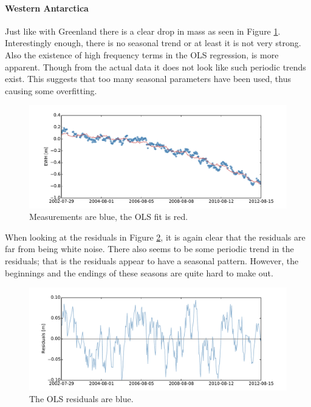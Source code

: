 \paragraph{Western Antarctica}

Just like with Greenland there is a clear drop in mass as seen in Figure \ref{fig:ols-selected-1-fit}. Interestingly enough, there is no seasonal trend or at least it is not very strong. Also the existence of high frequency terms in the OLS regression, is more apparent. Though from the actual data it does not look like such periodic trends exist. This suggests that too many seasonal parameters have been used, thus causing some overfitting.
\begin{figure}[H]
	\centering
	\includegraphics[width=\textwidth]{figures/ols-selected-1-fit}
	\caption{Measurements are blue, the OLS fit is red.}
	\label{fig:ols-selected-1-fit}
\end{figure}

When looking at the residuals in Figure \ref{fig:ols-selected-1-residual}, it is again clear that the residuals are far from being white noise. There also seems to be some periodic trend in the residuals; that is the residuals appear to have a seasonal pattern. However, the beginnings and the endings of these seasons are quite hard to make out. 

\begin{figure}[H]
	\centering
	\includegraphics[width=\textwidth]{figures/ols-selected-1-residual}
	\caption{The OLS residuals are blue.}
	\label{fig:ols-selected-1-residual}
\end{figure}

